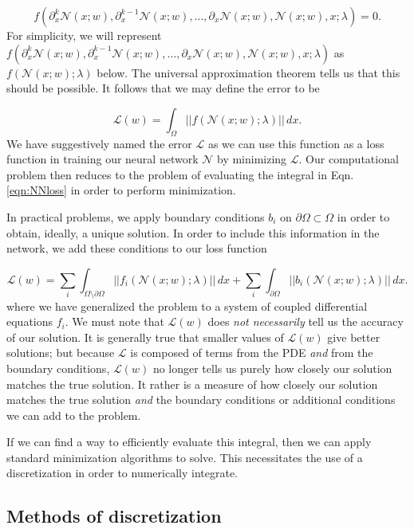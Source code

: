 \documentclass{CUP-JNL-DTM}%
\theoremstyle{definition}
\numberwithin{equation}{section}
\newcommand{\loss}{\mathcal{L}}
\newcommand{\net}{\mathcal{N}}
\begin{document}
\begin{equation}
	f(\partial^k_x\net(x;w), \partial^{k-1}_x \net(x;w), \dots, \partial_x \net(x;w), \net(x;w), x; \lambda) = 0.
	\label{eqn:NNapprox}
\end{equation}
For simplicity, we will represent $f(\partial^k_x\net(x;w), \partial^{k-1}_x \net(x;w), \dots, \partial_x \net(x;w), \net(x;w), x; \lambda)$ as $f(\net(x;w); \lambda)$ below. The universal approximation theorem tells us that this should be possible. It follows that we may define the error to be 

\begin{equation}
	\loss(w) = \int_{\Omega} ||f(\net(x;w); \lambda)||\,dx. 
	\label{eqn:NNloss}
\end{equation}
We have suggestively named the error $\loss$ as we can use this function as a loss function in training our neural network $\net$ by minimizing $\loss$. Our computational problem then reduces to the problem of evaluating the integral in Eqn. \ref{eqn:NNloss} in order to perform minimization. 

In practical problems, we apply boundary conditions $b_i$ on $\partial \Omega \subset \Omega$ in order to obtain, ideally, a unique solution. In order to include this information in the network, we add these conditions to our loss function

\begin{equation}
	\loss(w) = \sum_i\int_{\Omega\setminus\partial\Omega} ||f_i(\net(x;w); \lambda)||\,dx + \sum_i\int_{\partial\Omega} ||b_i(\net(x;w); \lambda)||\,dx.
	\label{eqn:complete_loss} 
\end{equation}
where we have generalized the problem to a system of coupled differential equations $f_i$. We must note that $\loss(w)$ does \emph{not necessarily} tell us the accuracy of our solution. It is generally true that smaller values of $\loss(w)$ give better solutions; but because $\loss$ is composed of terms from the PDE \emph{and} from the boundary conditions, $\loss(w)$ no longer tells us purely how closely our solution matches the true solution. It rather is a measure of how closely our solution matches the true solution \emph{and} the boundary conditions or additional conditions we can add to the problem. 

If we can find a way to efficiently evaluate this integral, then we can apply standard minimization algorithms to solve. This necessitates the use of a discretization in order to numerically integrate. 

\subsection{Methods of discretization}
\end{document}
